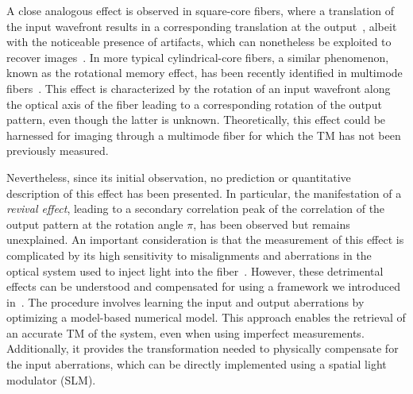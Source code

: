 \documentclass[aps,prl,twocolumn, amsmath,amssymb,superscriptaddress]{revtex4-2}
\begin{document}
A close analogous effect is observed in square-core fibers, where a translation of the input wavefront results in
a corresponding translation at the output~\cite{CaravacaAguirre2021optical}, 
albeit with the noticeable presence of artifacts,
which can nonetheless be exploited to recover images~\cite{Mezil2023Imaging}.
In more typical cylindrical-core fibers,
a similar phenomenon, known as the rotational memory effect, 
has been recently identified in multimode fibers~\cite{amitonova2015rotational, Li2021memory}.
This effect is characterized by the rotation of an input wavefront along the optical axis of the fiber
leading to a corresponding rotation of the output pattern, 
even though the latter is unknown.
Theoretically, this effect could be harnessed for imaging through a multimode fiber for which the TM has not been previously measured.


Nevertheless, since its initial observation, 
no prediction or quantitative description of this effect has been presented.
In particular, the manifestation of a \textit{revival effect}, 
leading to a secondary correlation peak of the correlation of the output pattern
at the rotation angle $\pi$, has been observed but remains unexplained.
An important consideration is that the measurement of this effect is complicated by its high sensitivity to
misalignments and aberrations in the optical system used to inject light into the fiber~\cite{amitonova2015rotational}.
However, these detrimental effects can be understood and compensated for
using a framework we introduced in~\cite{matthes2021learning}.
The procedure involves learning the input and output aberrations by optimizing
a model-based numerical model.
This approach enables the retrieval of an accurate TM of the system, 
even when using imperfect measurements.
Additionally, it provides the transformation needed to physically compensate for the input aberrations,
which can be directly implemented using a spatial light modulator (SLM).
\end{document}
